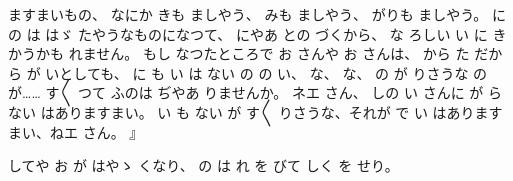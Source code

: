 ますまいもの、
なにか
きも
ましやう、
みも
ましやう、
がりも
ましやう。
に
の
は
はゞ
たやうなものになつて、
にやあ
との
づくから、
な
ろしい
い
に%
き
かうかも
れません。
もし
なつたところで
お
さんや
お
さんは、
から
た
だから
が
いとしても、
に
も
い
は
ない
の
の
い、
な、
な、
の
が
りさうな
の
が……
す〳〵
つて
ふのは
ぢやあ
りませんか。
ネエ
さん、
しの
い
さんに
が
らない
はありますまい。
い
も
ない
が
す〳〵
りさうな、それが
で
い
はありますまい、ねエ
さん。
』

してや
お
が
はやゝ
くなり、
の
は
れ
を
びて
しく
を
せり。
